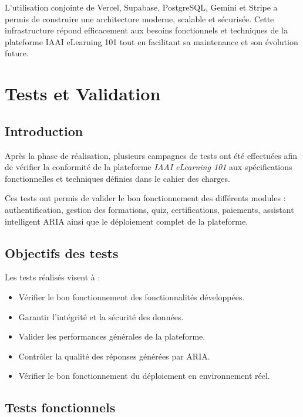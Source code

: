 \documentclass[12pt, a4paper]{report}
\begin{document}
L'utilisation conjointe de Vercel, Supabase, PostgreSQL, Gemini et Stripe a
permis de construire une architecture moderne, scalable et sécurisée. Cette
infrastructure répond efficacement aux besoins fonctionnels et techniques de la
plateforme IAAI eLearning 101 tout en facilitant sa maintenance et son évolution
future.
\newpage
\chapter{Tests et Validation}

\section{Introduction}

Après la phase de réalisation, plusieurs campagnes de tests ont été effectuées afin
de vérifier la conformité de la plateforme \textit{IAAI eLearning 101} aux
spécifications fonctionnelles et techniques définies dans le cahier des charges.

Ces tests ont permis de valider le bon fonctionnement des différents modules :
authentification, gestion des formations, quiz, certifications, paiements,
assistant intelligent ARIA ainsi que le déploiement complet de la plateforme.

\section{Objectifs des tests}

Les tests réalisés visent à :

\begin{itemize}
    \item Vérifier le bon fonctionnement des fonctionnalités développées.
    \item Garantir l'intégrité et la sécurité des données.
    \item Valider les performances générales de la plateforme.
    \item Contrôler la qualité des réponses générées par ARIA.
    \item Vérifier le bon fonctionnement du déploiement en environnement réel.
\end{itemize}

\section{Tests fonctionnels}
\end{document}
